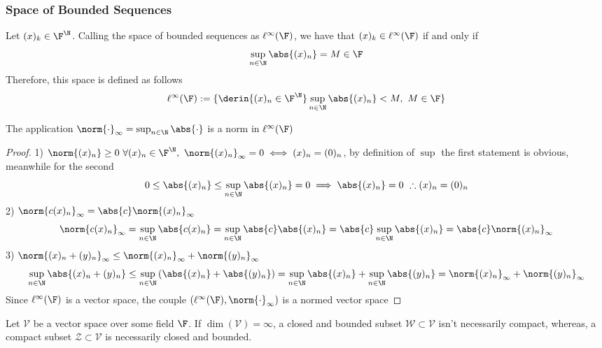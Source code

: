 \documentclass[../mmf.tex]{subfiles}
\begin{document}
\subsubsection{Space of Bounded Sequences}
\begin{dfn}
	Let $(x)_k\in\F^{\N}$. Calling the space of bounded sequences as $\ell^\infty(\F)$, we have that $(x)_k\in\ell^\infty(\F)$ if and only if
	\begin{equation}
		\sup_{n\in\N}\abs{(x)_n}=M\in\F
		\label{eq:boundedseq}
	\end{equation}
	Therefore, this space is defined as follows
	\begin{equation}
		\ell^\infty(\F):=\{\derin{(x)_n\in\F^{\N}}\sup_{n\in\N}\abs{(x)_n}<M,\ M\in\F\}
		\label{eq:ellinf}
	\end{equation}
\end{dfn}
\begin{thm}
	The application $\norm{\cdot}_{\infty}=\sup_{n\in\N}\abs{\cdot}$ is a norm in $\ell^\infty(\F)$
\end{thm}
\begin{proof}
	1) $\norm{(x)_n}\ge0\ \forall(x)_n\in\F^{\N},\ \norm{(x)_n}_{\infty}=0\iff(x)_n=(0)_n$, by definition of $\sup$ the first statement is obvious, meanwhile for the second
	\begin{equation*}
		0\le\abs{(x)_n}\le\sup_{n\in\N}\abs{(x)_{n}}=0\implies{}\abs{(x)_n}=0\ \therefore(x)_n=(0)_n
	\end{equation*}
	2) $\norm{c(x)_n}_{\infty}=\abs{c}\norm{(x)_n}_{\infty}$
	\begin{equation*}
		\norm{c(x)_n}_{\infty}=\sup_{n\in\N}\abs{c(x)_n}=\sup_{n\in\N}\abs{c}\abs{(x)_n}=\abs{c}\sup_{n\in\N}\abs{(x)_n}=\abs{c}\norm{(x)_n}_{\infty}
	\end{equation*}
	3) $\norm{(x)_n+(y)_n}_{\infty}\le\norm{(x)_n}_\infty+\norm{(y)_n}_\infty$
	\begin{equation*}
		\sup_{n\in\N}\abs{(x)_n+(y)_n}\le\sup_{n\in\N}\left( \abs{(x)_n}+\abs{(y)_n} \right)=\sup_{n\in\N}\abs{(x)_n}+\sup_{n\in\N}\abs{(y)_n}=\norm{(x)_n}_\infty+\norm{(y)_n}_\infty
	\end{equation*}
	Since $\ell^\infty(\F)$ is a vector space, the couple $(\ell^\infty(\F),\norm{\cdot}_{\infty})$ is a normed vector space
\end{proof}
\begin{rmk}
	Let $\mathcal{V}$ be a vector space over some field $\F$. If $\dim(\mathcal{V})=\infty$, a closed and bounded subset $\mathcal{W}\subset\mathcal{V}$ isn't necessarily compact, whereas, a compact subset $\mathcal{Z}\subset\mathcal{V}$ is necessarily closed and bounded.
\end{rmk}
\end{document}
